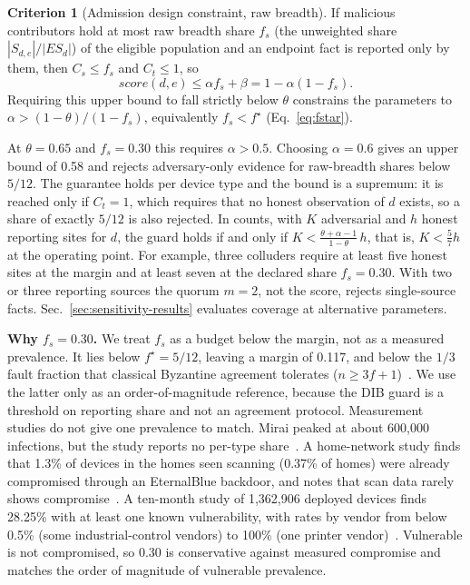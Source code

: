 \documentclass[journal]{IEEEtran}
\theoremstyle{definition}
\newtheorem{criterion}{Criterion}
\begin{document}
\begin{criterion}[Admission design constraint, raw breadth]
\label{crit:poison-bound}
If malicious contributors hold at most raw breadth share $f_s$ (the unweighted share $|S_{d,e}|/|ES_d|$) of the eligible population and an endpoint fact is reported only by them, then $C_s\le f_s$ and $C_t\le1$, so
\begin{equation}
score(d,e)\le\alpha f_s+\beta
=1-\alpha(1-f_s).
\label{eq:poisonbound}
\end{equation}
Requiring this upper bound to fall strictly below $\theta$ constrains the parameters to $\alpha>(1-\theta)/(1-f_s)$, equivalently $f_s<f^\star$ (Eq.~\ref{eq:fstar}).
\end{criterion}

At $\theta=0.65$ and $f_s=0.30$ this requires $\alpha>0.5$. Choosing $\alpha=0.6$ gives an upper bound of 0.58 and rejects adversary-only evidence for raw-breadth shares below $5/12$. The guarantee holds per device type and the bound is a supremum: it is reached only if $C_t=1$, which requires that no honest observation of $d$ exists, so a share of exactly $5/12$ is also rejected. In counts, with $K$ adversarial and $h$ honest reporting sites for $d$, the guard holds if and only if $K<\frac{\theta+\alpha-1}{1-\theta}\,h$, that is, $K<\frac57h$ at the operating point. For example, three colluders require at least five honest sites at the margin and at least seven at the declared share $f_s=0.30$. With two or three reporting sources the quorum $m=2$, not the score, rejects single-source facts. Sec.~\ref{sec:sensitivity-results} evaluates coverage at alternative parameters.

\textbf{Why $f_s=0.30$.} We treat $f_s$ as a budget below the margin, not as a measured prevalence. It lies below $f^\star=5/12$, leaving a margin of 0.117, and below the $1/3$ fault fraction that classical Byzantine agreement tolerates ($n\ge3f+1$)~\cite{lamport1982byzantine,castro1999pbft}. We use the latter only as an order-of-magnitude reference, because the DIB guard is a threshold on reporting share and not an agreement protocol. Measurement studies do not give one prevalence to match. Mirai peaked at about 600{,}000 infections, but the study reports no per-type share~\cite{mirai}. A home-network study finds that 1.3\% of devices in the homes seen scanning (0.37\% of homes) were already compromised through an EternalBlue backdoor, and notes that scan data rarely shows compromise~\cite{kumar2019allthings}. A ten-month study of 1{,}362{,}906 deployed devices finds 28.25\% with at least one known vulnerability, with rates by vendor from below 0.5\% (some industrial-control vendors) to 100\% (one printer vendor)~\cite{zhao2022largescale}. Vulnerable is not compromised, so 0.30 is conservative against measured compromise and matches the order of magnitude of vulnerable prevalence.
\end{document}
